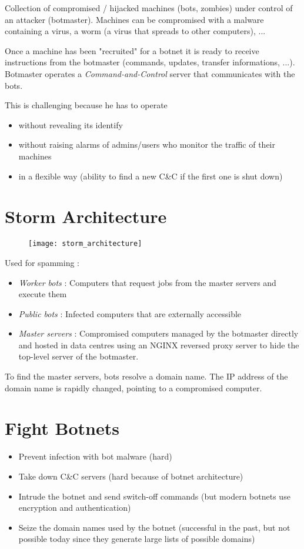 Collection of compromised / hijacked machines (bots, zombies) under control of an attacker (botmaster). Machines can be compromised with a malware containing a virus, a worm (a virus that spreads to other computers), ...

Once a machine has been "recruited" for a botnet it is ready to receive instructions from the botmaster (commands, updates, transfer informations, ...). Botmaster operates a \textit{Command-and-Control} server that communicates with the bots.

This is challenging because he has to operate 
\begin{itemize}
    \item without revealing its identify
    \item without raising alarms of admins/users who monitor the traffic of their machines
    \item in a flexible way (ability to find a new C\&C if the first one is shut down)
\end{itemize}

\section{Storm Architecture}

\begin{figure}[H]
    \centering
    \texttt{[image: storm\_architecture]}
\end{figure}

Used for spamming :
\begin{itemize}
    \item \textit{Worker bots} : Computers that request jobs from the master servers and execute them
    \item \textit{Public bots} : Infected computers that are externally accessible
    \item \textit{Master servers} : Compromised computers managed by the botmaster directly and hosted in data centres using an NGINX reversed proxy server to hide the top-level server of the botmaster.
\end{itemize}

To find the master servers, bots resolve a domain name. The IP address of the domain name is rapidly changed, pointing to a compromised computer.

\section{Fight Botnets}

\begin{itemize}
    \item Prevent infection with bot malware (hard)
    \item Take down C\&C servers (hard because of botnet architecture)
    \item Intrude the botnet and send switch-off commands (but modern botnets use encryption and authentication)
    \item Seize the domain names used by the botnet (successful in the past, but not possible today since they generate large lists of possible domains)
\end{itemize}
